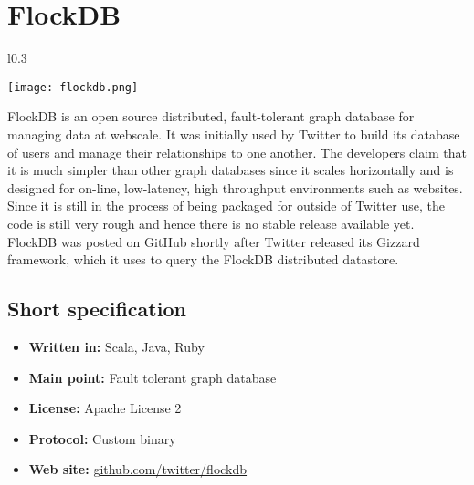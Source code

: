 \chapter{FlockDB}

\begin{wrapfigure}{l}{0.3\textwidth}
  \vspace{-75pt}
  \begin{center}
    \texttt{[image: flockdb.png]}
  \end{center}
  \vspace{-30pt}
\end{wrapfigure}
FlockDB is an open source distributed, fault-tolerant graph database for managing data at webscale. It was initially used by Twitter to build its database of users and manage their relationships to one another. The developers claim that it is much simpler than other graph databases since it scales horizontally and is designed for on-line, low-latency, high throughput environments such as websites. Since it is still in the process of being packaged for outside of Twitter use, the code is still very rough and hence there is no stable release available yet. FlockDB was posted on GitHub shortly after Twitter released its Gizzard framework, which it uses to query the FlockDB distributed datastore. 

\section{Short specification}

\begin{itemize}
  \item \textbf{Written in:} Scala, Java, Ruby
  \item \textbf{Main point:} Fault tolerant graph database
  \item \textbf{License:} Apache License 2
  \item \textbf{Protocol:} Custom binary
  \item \textbf{Web site:} \href{https://github.com/twitter/flockdb}{github.com/twitter/flockdb}
\end{itemize}